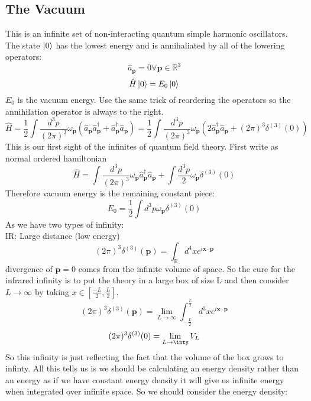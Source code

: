 \documentclass[12pt, a4paper, twoside, titlepage]{article}
\begin{document}
\subsection{The Vacuum}
This is an infinite set of non-interacting quantum simple harmonic oscillators. The state $\ket{0}$ has the lowest energy and is annihaliated by all of the lowering operators:
$$
\hat a_{\bm p} = 0 \forall \bm p \in \mathbb{R}^3
$$
$$
\hat H \ket{0} = E_0 \ket{0}
$$
$E_0$ is the vacuum energy. Use the same trick of reordering the operators so the annihilation operator is always to the right.
$$
\hat H = \frac{1}{2}  \int \frac{d^3 p}{(2 \pi)^3} \omega_{\bm p} (\hat a_{\bm p}\hat a^{\dagger}_{\bm p} + \hat a^{\dagger}_{\bm p} \hat a_{\bm p}) = \frac{1}{2}  \int \frac{d^3 p}{(2 \pi)^3} \omega_{\bm p} (2 \hat a^{\dagger}_{\bm p} \hat a_{\bm p} + (2\pi)^3\delta^{(3)}(0)) 
$$
This is our first sight of the infinites of quantum field theory. First write as normal ordered hamiltonian
$$
\hat H = \int \frac{d^3 p}{(2 \pi)^3}  \omega_{\bm p}  \hat a^{\dagger}_{\bm p} \hat a_{\bm p} +\int \frac{d^3 p}{2} \omega_{\bm p}  \delta^{(3)}(0) 
$$
Therefore vacuum energy is the remaining constant piece:
$$
E_0 = \frac{1}{2} \int d^3p \omega_{\bm p} \delta^{(3)}(0)
$$
As we have two types of infinity:\\
IR: Large distance (low energy)
$$
(2 \pi)^3 \delta^{(3)}(\bm p) = \int_{\mathbb{R}} d^4 x e^{i \bm x \cdot \bm p}
$$
divergence of $\bm p = 0$ comes from the infinite volume of space. So the cure for the infrared infinity is to put the theory in a large box of size L and then consider $L \rightarrow \infty$ by taking $x \in [\frac{-L}{2}, \frac{L}{2}]$.
$$
(2\pi)^3 \delta^{(3)}(\bm p) = \lim_{L\rightarrow \infty} \int^{\frac{L}{2}}_{-\frac{L}{2}} d^3 x e^{i \bm x \cdot \bm p} $$
$$
(2\pi)^3 \delta^{(3)}(0) = \lim_{L \rightarrow \inty} V_L
$$
So this infinity is just reflecting the fact that the volume of the box grows to infinty. All this tells us is we should be calculating an energy density rather than an energy as if we have constant energy density it will give us infinite energy when integrated over infinite space. So we should consider the energy density:
\end{document}
